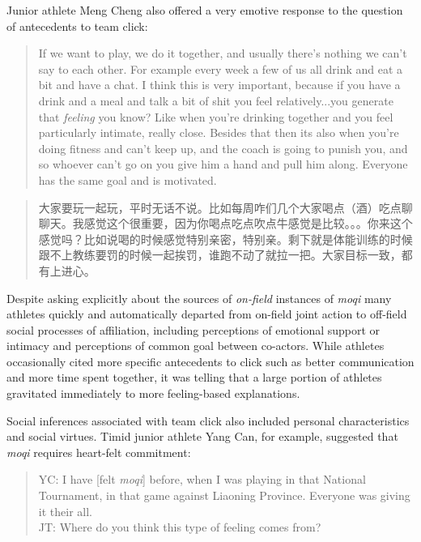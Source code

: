 \begin{CJK}{UTF8}{gbsn}
Junior athlete Meng Cheng also offered a very emotive response to the question of antecedents to team click:

      \begin{quote}
        If we want to play, we do it together, and usually there’s nothing we can’t say to each other.  For example every week a few of us all drink and eat a bit and have a chat.  I think this is very important, because if you have a drink and a meal and talk a bit of shit you feel relatively...you generate that \textit{feeling} you know? Like when you’re drinking together and you feel particularly intimate, really close.  Besides that then its also when you’re doing fitness and can’t keep up, and the coach is going to punish you, and so whoever can’t go on you give him a hand and pull him along.  Everyone has the same goal and is motivated.
      \end{quote}

      \begin{quote}
        大家要玩一起玩，平时无话不说。比如每周咋们几个大家喝点（酒）吃点聊聊天。我感觉这个很重要，因为你喝点吃点吹点牛感觉是比较。。。你来这个感觉吗？比如说喝的时候感觉特别亲密，特别亲。剩下就是体能训练的时候跟不上教练要罚的时候一起挨罚，谁跑不动了就拉一把。大家目标一致，都有上进心。
      \end{quote}

Despite asking explicitly about the sources of \textit{on-field} instances of \textit{moqi} many athletes quickly and automatically departed from on-field joint action to off-field social processes of affiliation, including perceptions of emotional support or intimacy and perceptions of common goal between co-actors. While athletes occasionally cited more specific antecedents to click such as better communication and more time spent together, it was telling that a large portion of athletes gravitated immediately to more feeling-based explanations.

Social inferences associated with team click also included personal characteristics and social virtues.  Timid junior athlete Yang Can, for example, suggested that \textit{moqi} requires heart-felt commitment:

    \begin{quote}
      YC: I have [felt \textit{moqi}] before, when I was playing in that National Tournament, in that game against Liaoning Province.  Everyone was giving it their all. \\

      JT: Where do you think this type of feeling comes from? \\


\end{quote}
\end{CJK}
